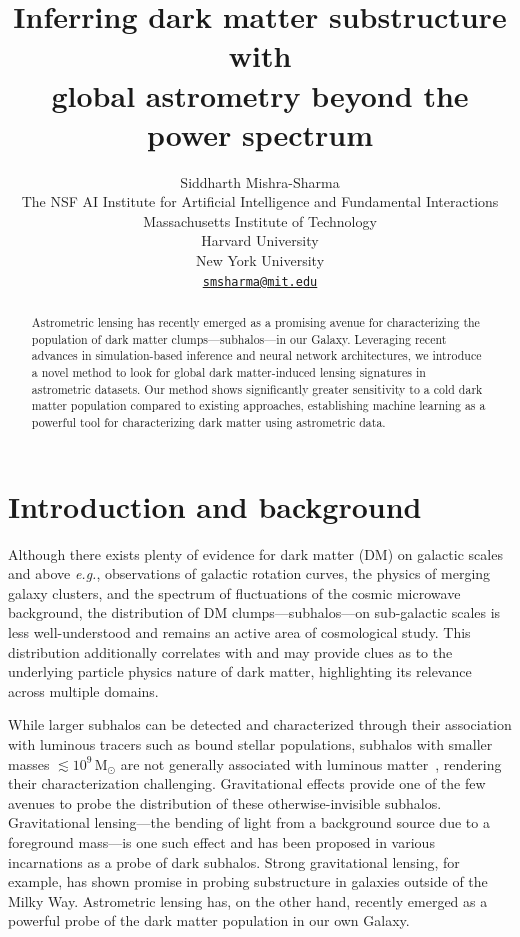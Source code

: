 \documentclass[preprint]{article}
\title{Inferring dark matter substructure with \\ global astrometry beyond the power spectrum}
\author{
Siddharth Mishra-Sharma \\
The NSF AI Institute for Artificial Intelligence and Fundamental Interactions \\
Massachusetts Institute of Technology \\
Harvard University \\ 
New York University \\
\href{mailto:smsharma@mit.edu}{\texttt{smsharma@mit.edu}} \\
}
\begin{document}

\maketitle

\begin{abstract}
Astrometric lensing has recently emerged as a promising avenue for characterizing the population of dark matter clumps---subhalos---in our Galaxy. Leveraging recent advances in simulation-based inference and neural network architectures, we introduce a novel method to look for global dark matter-induced lensing signatures in astrometric datasets. Our method shows significantly greater sensitivity to a cold dark matter population compared to existing approaches, establishing machine learning as a powerful tool for characterizing dark matter using astrometric data. 
\end{abstract}

\section{Introduction and background}
\label{sec:intro}

Although there exists plenty of evidence for dark matter (DM) on galactic scales and above \emph{e.g.}, observations of galactic rotation curves, the physics of merging galaxy clusters, and the spectrum of fluctuations of the cosmic microwave background, the distribution of DM clumps---subhalos---on sub-galactic scales is less well-understood and remains an active area of cosmological study. This distribution additionally correlates with and may provide clues as to the underlying particle physics nature of dark matter, highlighting its relevance across multiple domains. 

While larger subhalos can be detected and characterized through their association with luminous tracers such as bound stellar populations, subhalos with smaller masses $\lesssim 10^9\,\mathrm M_\odot$ are not generally associated with luminous matter~\cite{Fitts:2016usl,2017MNRAS.467.2019R}, rendering their characterization challenging. Gravitational effects provide one of the few avenues to probe the distribution of these otherwise-invisible subhalos. Gravitational lensing---the bending of light from a background source due to a foreground mass---is one such effect and has been proposed in various incarnations as a probe of dark subhalos. 
 Strong gravitational lensing, for example, has shown promise in probing substructure in galaxies outside of the Milky Way.
 Astrometric lensing has, on the other hand, recently emerged as a powerful probe of the dark matter population in our own Galaxy.
\end{document}
